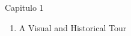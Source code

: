 \begin{frame}{Capitulo 1}
\begin{enumerate}
\item A Visual and Historical Tour
\end{enumerate}
\end{frame}